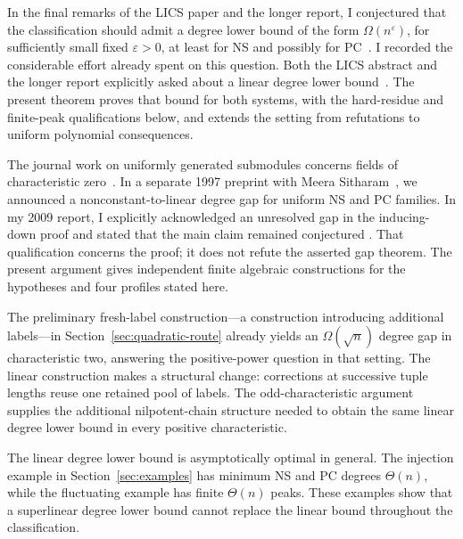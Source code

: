 \documentclass[11pt,a4paper]{article}
\theoremstyle{definition}\newtheorem{definition}[theorem]{Definition}
\theoremstyle{remark}\newtheorem{remark}[theorem]{Remark}
\begin{document}
In the final remarks of the LICS paper and the longer report, I
conjectured that the classification should admit a degree lower bound
of the form $\Omega(n^\varepsilon)$, for sufficiently small fixed $\varepsilon>0$,
at least for NS and possibly for PC~\cite[Section~8]{Riis}\cite[Section~9]{RiisLong}.
I recorded the considerable effort already spent on this question.
Both the LICS abstract and the longer report explicitly asked about a
linear degree lower bound~\cite{Riis,RiisLong}.
The present theorem proves that bound for both systems, with the
hard-residue and finite-peak qualifications below, and extends the
setting from refutations to uniform polynomial consequences.

The journal work on uniformly generated submodules concerns fields of
characteristic zero~\cite{RiisSitharamModules}. In a separate 1997
preprint with Meera Sitharam~\cite{RiisSitharam1997}, we announced a
nonconstant-to-linear degree gap for uniform NS and PC families.
In my 2009 report, I explicitly acknowledged an unresolved gap in the
inducing-down proof and stated that the main claim remained conjectured
\cite[p.~50, footnote~3; p.~53, reference~33]{RiisLong}.
That qualification concerns the proof; it does not refute the asserted
gap theorem. The present argument gives independent finite algebraic
constructions for the hypotheses and four profiles stated here.

The preliminary fresh-label construction---a construction introducing
additional labels---in Section~\ref{sec:quadratic-route} already yields an $\Omega(\sqrt n)$
degree gap in characteristic two, answering the positive-power question
in that setting. The linear construction makes a structural change:
corrections at successive tuple lengths reuse one retained pool of labels.
The odd-characteristic argument supplies the additional nilpotent-chain
structure needed to obtain the same linear degree lower bound in every
positive characteristic.

The linear degree lower bound is asymptotically optimal in general. The
injection example in Section~\ref{sec:examples} has minimum NS and PC
degrees $\Theta(n)$, while the fluctuating example has finite
$\Theta(n)$ peaks. These examples show that a superlinear degree lower
bound cannot replace the linear bound throughout the classification.
\end{document}
